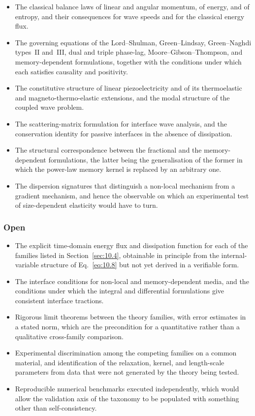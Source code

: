 \begin{itemize}
\item The classical balance laws of linear and angular momentum, of energy, and of entropy, and their consequences for wave speeds and for the classical energy flux.
\item The governing equations of the Lord--Shulman, Green--Lindsay, Green--Naghdi types~II and~III, dual and triple phase-lag, Moore--Gibson--Thompson, and memory-dependent formulations, together with the conditions under which each satisfies causality and positivity.
\item The constitutive structure of linear piezoelectricity and of its thermoelastic and magneto-thermo-elastic extensions, and the modal structure of the coupled wave problem.
\item The scattering-matrix formulation for interface wave analysis, and the conservation identity for passive interfaces in the absence of dissipation.
\item The structural correspondence between the fractional and the memory-dependent formulations, the latter being the generalisation of the former in which the power-law memory kernel is replaced by an arbitrary one.
\item The dispersion signatures that distinguish a non-local mechanism from a gradient mechanism, and hence the observable on which an experimental test of size-dependent elasticity would have to turn.
\end{itemize}

\subsubsection{Open}

\begin{itemize}
\item The explicit time-domain energy flux and dissipation function for each of the families listed in Section~\ref{sec:10.4}, obtainable in principle from the internal-variable structure of Eq.~\eqref{eq:10.8} but not yet derived in a verifiable form.
\item The interface conditions for non-local and memory-dependent media, and the conditions under which the integral and differential formulations give consistent interface tractions.
\item Rigorous limit theorems between the theory families, with error estimates in a stated norm, which are the precondition for a quantitative rather than a qualitative cross-family comparison.
\item Experimental discrimination among the competing families on a common material, and identification of the relaxation, kernel, and length-scale parameters from data that were not generated by the theory being tested.
\item Reproducible numerical benchmarks executed independently, which would allow the validation axis of the taxonomy to be populated with something other than self-consistency.
\end{itemize}

